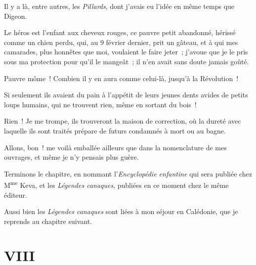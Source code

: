\documentclass[french,twoside]{book} %
\newcommand\chapteropen{} %
\newcommand\chapterclose{} %
\begin{document}
Il y a là, entre autres, les \emph{Pillards}, dont j’avais eu l’idée en même temps que Digeon.\par
Le héros est l’enfant aux cheveux rouges, ce pauvre petit abandonné, hérissé comme un chien perdu, qui, au 9 février dernier, prit un gâteau, et à qui mes camarades, plus honnêtes que moi, voulaient le faire jeter ; j’avoue que je le pris sous ma protection pour qu’il le mangeât ; il n’en avait sans doute jamais goûté.\par
Pauvre môme ! Combien il y en aura comme celui-là, jusqu’à la Révolution !\par
Si seulement ils avaient du pain à l’appétit de leurs jeunes dents avides de petits loups humains, qui ne trouvent rien, même en sortant du bois !\par
Rien ! Je me trompe, ils trouveront la maison de correction, où la dureté avec laquelle ils sont traités prépare de futurs condamnés à mort ou au bagne.\par
Allons, bon ! me voilà emballée ailleurs que dans la nomenclature de mes ouvrages, et même je n’y pensais plus guère.\par
Terminons le chapitre, en nommant l’\emph{Encyclopédie enfantine} qui sera publiée chez M\textsuperscript{me} Keva,  et les \emph{Légendes canaques}, publiées en ce moment chez le même éditeur.\par
Aussi bien les \emph{Légendes canaques} sont liées à mon séjour en Calédonie, que je reprends au chapitre suivant.
\chapterclose


\chapteropen
 \chapter[{VIII}]{VIII}
\label{p2.8}
\end{document}
